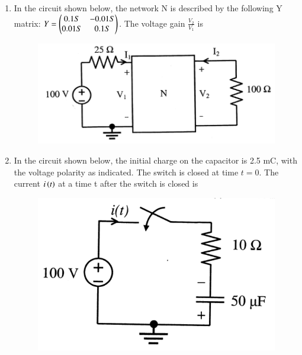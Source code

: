 \documentclass[a4paper, 11pt]{article}
\begin{document}
\begin{enumerate}
    \begin{enumerate}
    \end{enumerate}
    
    \hfill{}

    \item In the circuit shown below, the network N is described by the following Y matrix: $Y=\begin{pmatrix}0.1 S & -0.01 S \\ 0.01 S & 0.1S\end{pmatrix}$. The voltage gain $\frac{V_{2}}{V_{1}}$ is
    
    \begin{figure}[H]
        \centering
        \includegraphics[width=0.7\columnwidth]{figs/q33.png}
        \caption*{}
        \label{fig:q33}
    \end{figure}
    
    \begin{enumerate}
    \end{enumerate}

    \hfill{}

    \item In the circuit shown below, the initial charge on the capacitor is 2.5 mC, with the voltage polarity as indicated. The switch is closed at time $t=0$. The current $i\left(t\right)$ at a time t after the switch is closed is
    
    \begin{figure}[H]
        \centering
        \includegraphics[width=0.4\columnwidth]{figs/q34.png}
        \caption*{}
        \label{fig:q34}
    \end{figure}
    

\end{enumerate}
\end{document}
